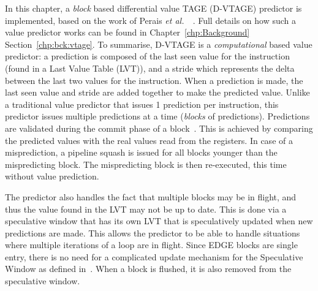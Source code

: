 In this chapter, a \textit{block} based differential value TAGE (D-VTAGE) predictor is implemented, based on the work of Perais {\it et al.~}~\cite{peraisBeBop2015}.
Full details on how such a value predictor works can be found in Chapter~\ref{chp:Background} Section~\ref{chp:bck:vtage}.
To summarise, D-VTAGE is a \textit{computational} based value predictor: a prediction is composed of the last seen value for the instruction (found in a Last Value Table (LVT)), and a stride which represents the delta between the last two values for the instruction.
When a prediction is made, the last seen value and stride are added together to make the predicted value.
Unlike a traditional value predictor that issues 1 prediction per instruction, this predictor issues multiple predictions at a time (\textit{blocks} of predictions).
Predictions are validated during the commit phase of a block~\cite{peraisVTAGE2014}.
This is achieved by comparing the predicted values with the real values read from the registers.
In case of a misprediction, a pipeline squash is issued for all blocks younger than the mispredicting block.
The mispredicting block is then re-executed, this time without value prediction.

The predictor also handles the fact that multiple blocks may be in flight, and thus the value found in the LVT may not be up to date.
This is done via a speculative window that has its own LVT that is speculatively updated when new predictions are made.
This allows the predictor to be able to handle situations where multiple iterations of a loop are in flight.
Since EDGE blocks are single entry, there is no need for a complicated update mechanism for the Speculative Window as defined in~\cite{peraisBeBop2015}.
When a block is flushed, it is also removed from the speculative window.





